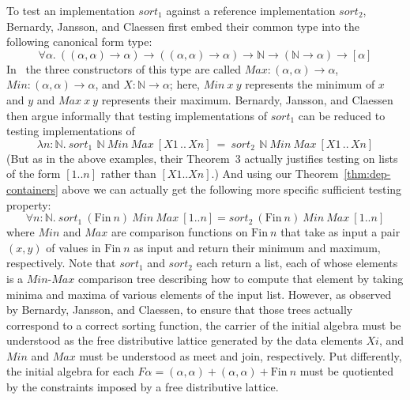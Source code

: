 \documentclass{article}[12 pt]
\theoremstyle{problemstyle}
\begin{document}
To test an implementation $\mathit{sort}_1$ against a reference
implementation $\mathit{sort}_2$, Bernardy, Jansson, and Claessen first
embed their common type into the following canonical form type:
\begin{displaymath}
\forall \alpha.~((\alpha, \alpha) \to \alpha) \to ((\alpha, \alpha)
\to \alpha) \to \mathbb{N} \to (\mathbb{N} \to \alpha) \to [\alpha]
\end{displaymath}
In~\cite{bjc10} the three constructors of this type are called
$\mathit{Max} : (\alpha, \alpha) \to \alpha$, $\mathit{Min} : (\alpha,
\alpha) \to \alpha$, and $X : \mathbb{N} \to \alpha$; here,
$\mathit{Min}~x~y$ represents the minimum of $x$ and $y$ and
$\mathit{Max}~x~y$ represents their maximum. Bernardy, Jansson, and
Claessen then argue informally that testing implementations of
$\mathit{sort}_1$ can be reduced to testing implementations of
\begin{displaymath}
\lambda n :
\mathbb{N}.~\mathit{sort}_1~\,\mathbb{N}~\mathit{Min}~\mathit{Max}~[X1
  \,.. \,Xn]~=~\mathit{sort}_2~\,\mathbb{N}~\mathit{Min}~\mathit{Max}~[X1
  \,.. \,Xn] 
\end{displaymath}
\noindent
(But as in the above examples, their Theorem~3 actually justifies
testing on lists of the form $[1..n]$ rather than $[X1..Xn]$.) And
using our Theorem~\ref{thm:dep-containers} above we can actually get
the following more specific sufficient testing property:
\begin{displaymath}
\forall n : \mathbb{N}.~\mathit{sort}_1~(\mathrm{Fin}~n)~
\mathit{Min}~\mathit{Max}~[1..n] =
\mathit{sort}_2~(\mathrm{Fin}~n)~\mathit{Min}~\mathit{Max}~[1..n]
\end{displaymath}
where $\mathit{Min}$ and $\mathit{Max}$ are comparison functions on
$\mathrm{Fin}~n$ that take as input a pair $(x,y)$ of values in
$\mathrm{Fin}~n$ as input and return their minimum and maximum,
respectively. Note that $\mathit{sort}_1$ and $\mathit{sort}_2$ each
return a list, each of whose elements is a
$\mathit{Min}$-$\mathit{Max}$ comparison tree describing how to
compute that element by taking minima and maxima of various elements
of the input list. However, as observed by Bernardy, Jansson, and
Claessen, to ensure that those trees actually correspond to a correct
sorting function, the carrier of the initial algebra must be
understood as the free distributive lattice generated by the data
elements $X i$, and $\mathit{Min}$ and $\mathit{Max}$ must be
understood as meet and join, respectively.  Put differently, the
initial algebra for each $F \alpha = (\alpha, \alpha) +
(\alpha,\alpha) + \mathrm{Fin}~n$ must be quotiented by the
constraints imposed by a free distributive lattice.
\end{document}
